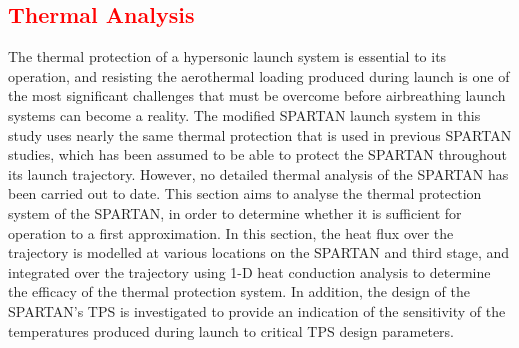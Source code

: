 
\textcolor{red}{
	\chapter{Thermal Analysis}
}


The thermal protection of a hypersonic launch system is essential to its operation, and resisting the aerothermal loading produced during launch is one of the most significant challenges that must be overcome before airbreathing launch systems can become a reality. The modified SPARTAN launch system in this study uses nearly the same thermal protection that is used in previous SPARTAN studies, which has been assumed to be able to protect the SPARTAN throughout its launch trajectory\cite{Preller2018a}. However, no detailed thermal analysis of the SPARTAN has been carried out to date. This section aims to analyse the thermal protection system of the SPARTAN, in order to determine whether it is sufficient for operation to a first approximation. In this section, the heat flux over the trajectory is modelled at various locations on the SPARTAN and third stage, and integrated over the trajectory using 1-D heat conduction analysis to determine the efficacy of the thermal protection system. In addition, the design of the SPARTAN's TPS is investigated to provide an indication of the sensitivity of the temperatures produced during launch to critical TPS design parameters. 





